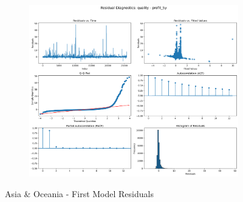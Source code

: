 \documentclass[11pt,english,a4paper,hidelinks]{book}
\begin{document}
\begin{figure}[H]
\begin{subfigure}[b]{0.32\textwidth}
    \end{subfigure}
    \hfill
    \begin{subfigure}[b]{0.32\textwidth}
        \centering
        \includegraphics[width=\textwidth]{images/code/models/linear_regression/first_model/AS/quality_profit_5y_residuals.png}
    \end{subfigure}
    \caption{Asia \& Oceania - First Model Residuals}
    \label{fig:linear_regression_AS_residues}
\end{figure}
\end{document}
